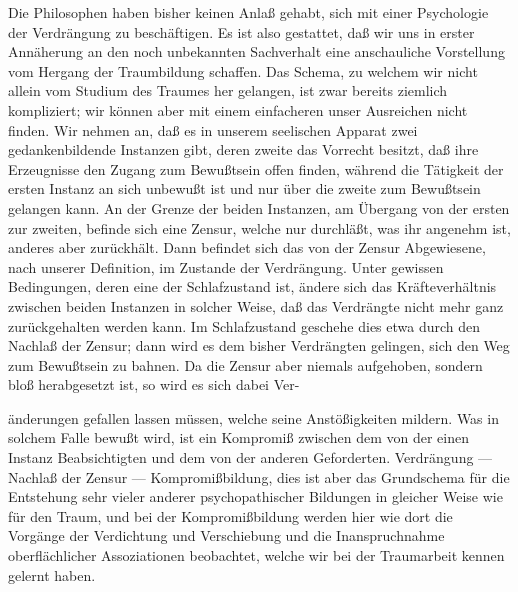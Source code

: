 \documentclass{article}
\begin{document}
            
        \pstart
        Die Philosophen haben bisher keinen Anlaß gehabt, sich mit einer Psychologie der
               Verdrängung zu beschäftigen. Es ist also gestattet, daß wir uns in erster
               Annäherung an den noch unbekannten Sachverhalt eine anschauliche
               Vorstellung vom Hergang der Traumbildung schaffen. Das Schema, zu welchem wir
               nicht allein vom Studium des Traumes her gelangen, ist zwar bereits
               ziemlich kompliziert; wir können aber mit einem einfacheren unser Ausreichen
               nicht finden. Wir nehmen an, daß es in unserem seelischen Apparat zwei
               gedankenbildende Instanzen gibt, deren zweite das Vorrecht besitzt, daß ihre
               Erzeugnisse den Zugang zum Bewußtsein offen finden, während die Tätigkeit der
               ersten Instanz an sich unbewußt ist und nur über die zweite zum Bewußtsein
               gelangen kann. An der Grenze der beiden Instanzen, am Übergang von
               der ersten zur zweiten, befinde sich eine Zensur, welche nur durchläßt, was ihr
               angenehm ist, anderes aber zurückhält. Dann befindet sich das von der Zensur
               Abgewiesene, nach unserer Definition, im Zustande der Verdrängung. Unter
               gewissen Bedingungen, deren eine der Schlafzustand ist, ändere sich
               das Kräfteverhältnis zwischen beiden Instanzen in solcher Weise, daß
               das Verdrängte nicht mehr ganz zurückgehalten werden kann. Im Schlafzustand
               geschehe dies etwa durch den Nachlaß der Zensur; dann wird es dem bisher
               Verdrängten gelingen, sich den Weg zum Bewußtsein zu bahnen. Da die Zensur aber
               niemals aufgehoben, sondern bloß herabgesetzt ist, so wird es sich
               dabei Ver-
        \pend
    
         
            
            
            
        \pstart
        änderungen gefallen lassen müssen, welche seine Anstößigkeiten
               mildern. Was in solchem Falle bewußt wird, ist ein Kompromiß zwischen dem von
               der einen Instanz Beabsichtigten und dem von der anderen Geforderten. Verdrängung — Nachlaß der Zensur — Kompromißbildung,
               dies ist aber das Grundschema für die Entstehung sehr vieler anderer
               psychopathischer Bildungen in gleicher Weise wie für den Traum, und bei der
               Kompromißbildung werden hier wie dort die Vorgänge der Verdichtung
               und Verschiebung und die Inanspruchnahme oberflächlicher
               Assoziationen beobachtet, welche wir bei der Traumarbeit kennen gelernt
               haben.
        \pend
    
\end{document}
